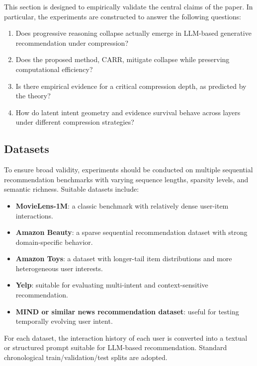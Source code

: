 \documentclass[11pt]{article}
\begin{document}
This section is designed to empirically validate the central claims of the paper. In particular, the experiments are constructed to answer the following questions:

\begin{enumerate}[label=\textbf{RQ\arabic*.}]
    \item Does progressive reasoning collapse actually emerge in LLM-based generative recommendation under compression?
    \item Does the proposed method, CARR, mitigate collapse while preserving computational efficiency?
    \item Is there empirical evidence for a critical compression depth, as predicted by the theory?
    \item How do latent intent geometry and evidence survival behave across layers under different compression strategies?
\end{enumerate}

\subsection{Datasets}

To ensure broad validity, experiments should be conducted on multiple sequential recommendation benchmarks with varying sequence lengths, sparsity levels, and semantic richness. Suitable datasets include:

\begin{itemize}
    \item \textbf{MovieLens-1M}: a classic benchmark with relatively dense user-item interactions.
    \item \textbf{Amazon Beauty}: a sparse sequential recommendation dataset with strong domain-specific behavior.
    \item \textbf{Amazon Toys}: a dataset with longer-tail item distributions and more heterogeneous user interests.
    \item \textbf{Yelp}: suitable for evaluating multi-intent and context-sensitive recommendation.
    \item \textbf{MIND or similar news recommendation dataset}: useful for testing temporally evolving user intent.
\end{itemize}

For each dataset, the interaction history of each user is converted into a textual or structured prompt suitable for LLM-based recommendation. Standard chronological train/validation/test splits are adopted.
\end{document}
